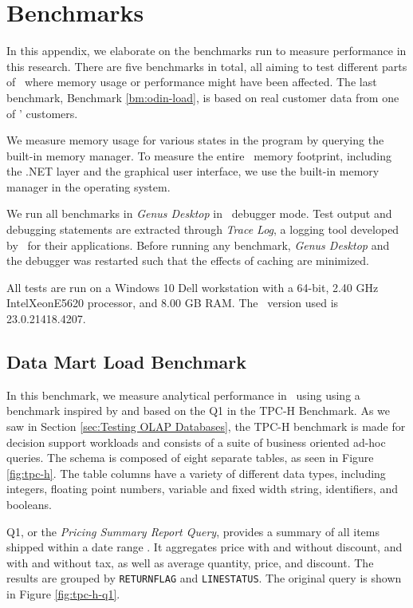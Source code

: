 \chapter{Benchmarks}
\label{app:bm}

In this appendix, we elaborate on the benchmarks run to measure performance in this research. There are five benchmarks in total, all aiming to test different parts of \gap~where memory usage or performance might have been affected. The last benchmark, Benchmark \ref{bm:odin-load}, is based on real customer data from one of \genus' customers.

We measure memory usage for various states in the program by querying the built-in  memory manager. To measure the entire \gap~memory footprint, including the .NET layer and the graphical user interface, we use the built-in memory manager in the  operating system. 

We run all benchmarks in \textit{Genus Desktop} in \delphi~debugger mode. Test output and debugging statements are extracted through \textit{Trace Log}, a logging tool developed by \genus~for their applications. Before running any benchmark, \textit{Genus Desktop} and the debugger was restarted such that the effects of caching are minimized.

All tests are run on a Windows 10 Dell workstation with a 64-bit, 2.40 GHz Intel\textregistered Xeon\textregistered E5620 processor, and 8.00 GB RAM. The \delphi~version used is 23.0.21418.4207. 


\section{Data Mart Load Benchmark}
\label{bm:q1}
In this benchmark, we measure analytical performance in \gap~using using a benchmark inspired by and based on the Q1 in the TPC-H Benchmark. As we saw in Section \ref{sec:Testing OLAP Databases}, the TPC-H benchmark is made for decision support workloads and consists of a suite of business oriented ad-hoc queries. The schema is composed of eight separate tables, as seen in Figure \ref{fig:tpc-h}. The table columns have a variety of different data types, including integers, floating point numbers, variable and fixed width string, identifiers, and booleans.


Q1, or the \textit{Pricing Summary Report Query}, provides a summary of all items shipped within a date range \cite{Transaction_Processing_Performance_Council_TPC2014-ux}. It aggregates price with and without discount, and with and without tax, as well as average quantity, price, and discount. The results are grouped by \texttt{RETURNFLAG} and \texttt{LINESTATUS}. The original query is shown in Figure \ref{fig:tpc-h-q1}.


